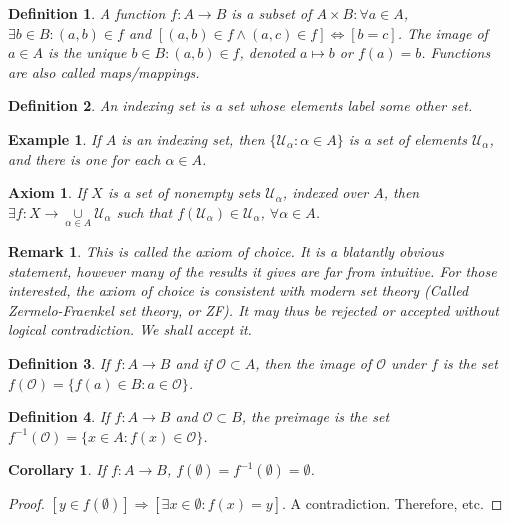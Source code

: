 \documentclass[12pt,oneside]{book}
\theoremstyle{mystyle}
\newtheorem{definition}{Definition}[section]
\newtheorem{corollary}{Corollary}[section]
\newtheorem{example}{Example}[section]
\newtheorem{remark}{Remark}[section]
\newtheorem{axiom}{Axiom}[section]
\begin{document}
\begin{definition}
A function $f:A\rightarrow B$ is a subset of $A\times B: \forall a\in A$, $\exists b\in B: (a,b)\in f$ and $[(a,b)\in f\land (a,c)\in f]\Leftrightarrow [b=c]$. The image of $a\in A$ is the unique $b\in B:(a,b)\in f$, denoted $a\mapsto b$ or $f(a)=b$. Functions are also called maps/mappings.
\end{definition}

\begin{definition}
An indexing set is a set whose elements label some other set.
\end{definition}

\begin{example}
If $A$ is an indexing set, then $\{\mathcal{U}_{\alpha}:\alpha \in A\}$ is a set of elements $\mathcal{U}_{\alpha}$, and there is one for each $\alpha \in A$.
\end{example}

\begin{axiom}
If $X$ is a set of nonempty sets $\mathcal{U}_{\alpha}$, indexed over $A$, then $\exists f:X\rightarrow \underset{\alpha \in A}\cup \mathcal{U}_{\alpha}$ such that $f(\mathcal{U}_{\alpha}) \in \mathcal{U}_{\alpha}$, $\forall \alpha\in A$.
\end{axiom}

\begin{remark}
This is called the axiom of choice. It is a blatantly obvious statement, however many of the results it gives are far from intuitive. For those interested, the axiom of choice is consistent with modern set theory (Called Zermelo-Fraenkel set theory, or ZF). It may thus be rejected or accepted without logical contradiction. We shall accept it.
\end{remark}

\begin{definition}
If $f:A\rightarrow B$ and if $\mathcal{O}\subset A$, then the image of $\mathcal{O}$ under $f$ is the set $f(\mathcal{O}) = \{f(a)\in B:a\in \mathcal{O}\}$.
\end{definition}

\begin{definition}
If $f:A\rightarrow B$ and $\mathscr{O}\subset B$, the preimage is the set $f^{-1}(\mathscr{O}) = \{x\in A:f(x)\in \mathscr{O}\}$.
\end{definition}

\begin{corollary}
If $f:A\rightarrow B$, $f(\emptyset) = f^{-1}(\emptyset) = \emptyset$.
\end{corollary}
\begin{proof}
$[y\in f(\emptyset)]\Rightarrow [\exists x\in \emptyset:f(x)=y]$. A contradiction. Therefore, etc.
\end{proof}
\end{document}
